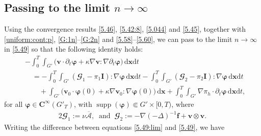 \documentclass[12pt,reqno]{amsart}
\numberwithin{equation}{section}
\theoremstyle{definition}
\def\dx{\,\mathrm{d}\boldsymbol{x}}
\def\dxt{\,\mathrm{d}\boldsymbol{x}\mathrm{d}t}
\def\supp{\operatorname{supp}}
\def\vv{\boldsymbol{v}}
\def\f{\boldsymbol{f}}
\def\bfC{\mathbf{C}}
\def\bfI{\mathbf{I}}
\def\bmcA{\boldsymbol{\mathcal{A}}}
\def\bfi{\boldsymbol{\varphi}}
\def\bcG{\mathbfcal{G}}
\begin{document}
\subsection{Passing to the limit $n\to\infty$}\label{PL}
Using the convergence results \eqref{5.46}, \eqref{5.42:8}, \eqref{5.044} and \eqref{5.45}, together with \eqref{uniform:cont:p}, \eqref{G:1n}--\eqref{G:2n} and \eqref{5.58}--\eqref{5.60}, we can pass to the limit $n\to\infty$ in \eqref{5.49} so that the following identity holds:
\begin{equation}\label{5.49:lim}
\begin{split}
&-\!\int_{0}^{T}\!\!\!\!\int_{G'}\big(\vv\cdot {\partial_t\bfi} +\kappa\nabla\vv:\nabla{\partial_t\bfi}\big)\dxt  \\
&\quad =
-\!\int_{0}^{T}\!\!\!\!\int_{G'}(\bcG_{1}-\pi_{1}\bfI):\nabla \bfi  \dxt
-
\!\int_{0}^{T}\!\!\!\!\int_{G'} (\bcG_{2}-\pi_{2}\bfI ): \nabla\bfi \dxt \\
&\qquad
+
\int_{G'}\big(\vv_{0}\cdot\bfi(0)+\kappa\nabla\vv_{0}:\nabla\bfi(0)\big)\dx +\!\int_{0}^{T}\!\!\!\!\int_{G'}\nabla\pi_{h}\cdot{\partial_t\bfi}\dxt,
\end{split}
\end{equation}
for all $\bfi \in \bfC^\infty(G'_T)$, with $\supp(\bfi)\Subset G'\times[0,T)$,
 where
\begin{alignat*}{2}
 {\bcG_1:=\nu\overline{\bmcA}},\ \text{ and } \
 \bcG_2:=-\nabla (-\Delta)^{-1}\f+\vv\otimes \vv.
\end{alignat*}
Writing the difference between equations \eqref{5.49:lim} and \eqref{5.49}, we have
\end{document}
